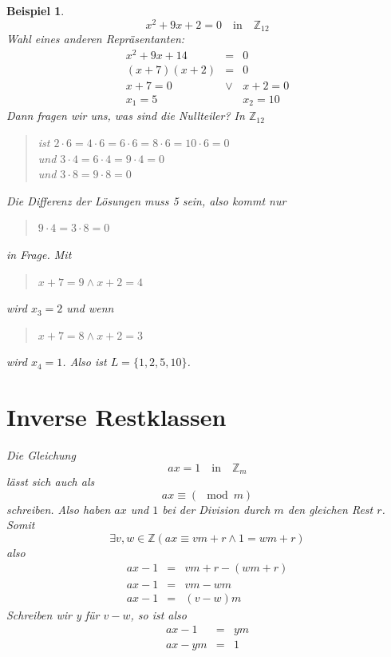 \documentclass{report}
\newtheorem{myexample}{Beispiel}
\begin{document}
\begin{myexample}\begin{equation}x^2 + 9x + 2 = 0 \quad \mbox{in} \quad \mathbb{Z}_{12} \end{equation}
Wahl eines anderen Repräsentanten:
\begin{eqnarray}x^2 + 9x + 14 & = & 0\nonumber \\
(x + 7) (x + 2) & = & 0\nonumber \\
x + 7 = 0 & \lor & x + 2 = 0\nonumber \\
x_1 = 5 & & x_2 = 10\end{eqnarray}
Dann fragen wir uns, was sind die Nullteiler? In $\mathbb{Z}_{12}$
\begin{quote}ist $2 \cdot 6 = 4 \cdot 6 = 6 \cdot 6 = 8 \cdot 6 = 10 \cdot 6 = 0$\\
und $3 \cdot 4 = 6 \cdot 4 = 9 \cdot 4 = 0$\\
und $3 \cdot 8 = 9 \cdot 8 = 0$ \end{quote}
Die Differenz der Lösungen muss 5 sein, also kommt nur
\begin{quote}$9 \cdot 4 = 3 \cdot 8 = 0$ \end{quote}
in Frage. Mit
\begin{quote}$x + 7 = 9 \land x + 2 = 4$\end{quote} wird $x_3 = 2$ und wenn
\begin{quote}$x + 7 = 8 \land x + 2 = 3$\end{quote} wird $x_4 = 1$. Also ist $L=\{1, 2, 5, 10\}$.
\section{Inverse Restklassen}
Die Gleichung
\begin{equation}ax = 1 \quad \mbox{in} \quad \mathbb{Z}_m \end{equation}
lässt sich auch als
\begin{equation}ax \equiv (\mod{m})\end{equation}
schreiben. Also haben $ax$ und $1$ bei der Division durch $m$ den gleichen Rest $r$. Somit
\begin{equation}\exists v, w \in \mathbb{Z} ( ax \equiv vm + r \land 1 = wm + r )\end{equation}
also
\begin{eqnarray}ax - 1 & = & vm + r - (wm + r)\nonumber \\
ax - 1 & = & vm -wm\nonumber \\
ax - 1 & = & (v -w)m\end{eqnarray}
Schreiben wir y für $v-w$, so ist also
\begin{eqnarray}ax - 1 & = & ym\nonumber \\
ax - ym & = & 1\end{eqnarray}\end{myexample}
\end{document}

